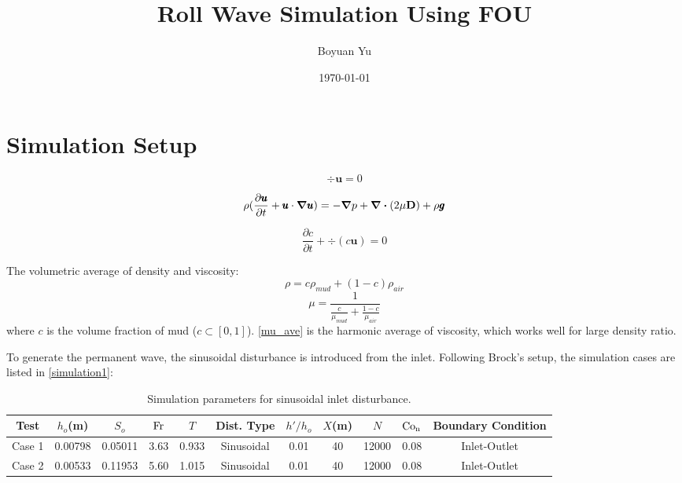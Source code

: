 \documentclass[a4paper]{article}
\title{Roll Wave Simulation Using FOU}
\author{
Boyuan Yu}
\date{\today}
\newcommand{\fr}{\rm{Fr}}
\begin{document}
\maketitle



\section{Simulation Setup}
\begin{equation}
	\div{\pmb{u}}=0
	\label{ns1}
\end{equation}

\begin{equation}
	\rho(\frac{\partial \pmb{u}}{\partial t}+\pmb{u} \cdot {\grad{\pmb{u}}})=-\grad{p}+\div{(2\mu \vb{D})}+\rho \pmb{g}
	\label{ns2}
\end{equation}

\begin{equation}
	\frac{\partial c}{\partial t}+\div{(c\pmb{u})}=0
	\label{ns3}
\end{equation}	

The volumetric average of density and viscosity:
\begin{equation}
	\rho = c\rho_{mud}+(1-c)\rho_{air}
	\label{c_ave}
\end{equation}
\begin{equation}
	\mu = \frac{1}{\frac{c}{\mu_{mud}}+\frac{1-c}{\mu_{air}}}
	\label{mu_ave}
\end{equation}
where $c$ is the volume fraction of mud ($c\subset [0,1]$). \autoref{mu_ave} is the harmonic  average of viscosity, which works well for large density ratio.

To generate the permanent wave, the sinusoidal disturbance is introduced from the inlet. Following Brock's setup, the simulation cases are listed in \autoref{simulation1}:
\begin{table}[htbp]
	\centering
	\caption{Simulation parameters for sinusoidal inlet disturbance.}
	\label{simulation1}
	\begin{threeparttable}
		\begin{tabular}{ccccccccccc}
			\toprule
			Test & $h_o$(m) & $S_o$ & $\fr$ & $T$ & Dist. Type & $h'/h_o$ & $X$(m) &$N$ &$\rm{Co_n}$&Boundary Condition \\
			\midrule
			Case 1  & 0.00798 & 0.05011 & 3.63 & 0.933 &Sinusoidal & 0.01 & 40 &12000 & 0.08&Inlet-Outlet \\
			Case 2 & 0.00533 & 0.11953 & 5.60 & 1.015 & Sinusoidal & 0.01 & 40 &12000 &0.08&Inlet-Outlet\\
			\bottomrule    
		\end{tabular}

	\end{threeparttable}
\end{table}
\end{document}
